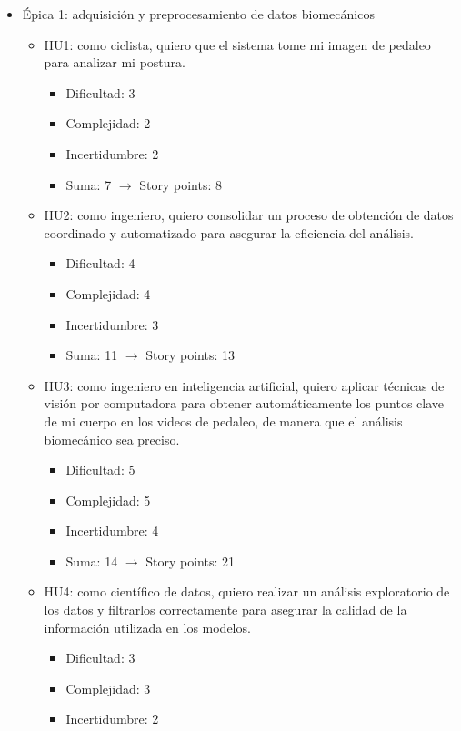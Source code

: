 \documentclass[
11pt, %
]{charter}
\begin{document}
\begin{itemize}
  \item Épica 1: adquisición y preprocesamiento de datos biomecánicos
    \begin{itemize}
      \item HU1: como ciclista, quiero que el sistema tome mi imagen de pedaleo para analizar mi postura.
        \begin{itemize}
          \item Dificultad: 3
          \item Complejidad: 2
          \item Incertidumbre: 2
          \item Suma: 7 $\rightarrow$ Story points: 8
        \end{itemize}
      \item HU2: como ingeniero, quiero consolidar un proceso de obtención de datos coordinado y automatizado para asegurar la eficiencia del análisis.
        \begin{itemize}
          \item Dificultad: 4
          \item Complejidad: 4
          \item Incertidumbre: 3
          \item Suma: 11 $\rightarrow$ Story points: 13
        \end{itemize}
      \item HU3: como ingeniero en inteligencia artificial, quiero aplicar técnicas de visión por computadora para obtener automáticamente los puntos clave de mi cuerpo en los videos de pedaleo, de manera que el análisis biomecánico sea preciso.
        \begin{itemize}
          \item Dificultad: 5
          \item Complejidad: 5
          \item Incertidumbre: 4
          \item Suma: 14 $\rightarrow$ Story points: 21
        \end{itemize}
      \item HU4: como científico de datos, quiero realizar un análisis exploratorio de los datos y filtrarlos correctamente para asegurar la calidad de la información utilizada en los modelos.
        \begin{itemize}
          \item Dificultad: 3
          \item Complejidad: 3
          \item Incertidumbre: 2

\end{itemize}
\end{itemize}
\end{itemize}
\end{document}
